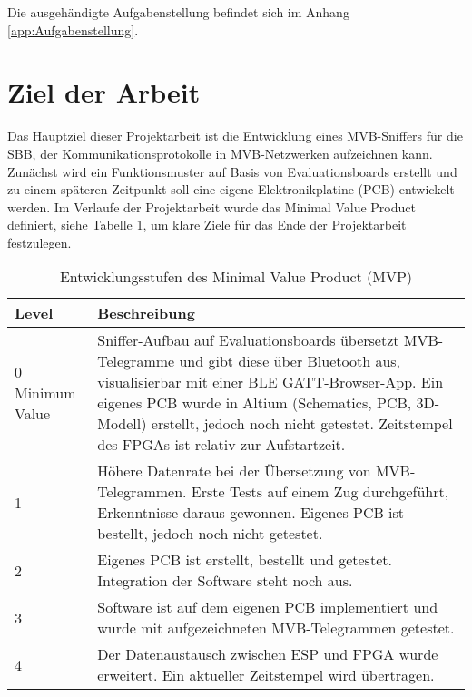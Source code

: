 Die ausgehändigte Aufgabenstellung befindet sich im Anhang \ref{app:Aufgabenstellung}.


\section{Ziel der Arbeit}
\label{Ziel der Arbeit} %

Das Hauptziel dieser Projektarbeit ist die Entwicklung eines MVB-Sniffers für die SBB, der Kommunikationsprotokolle in MVB-Netzwerken aufzeichnen kann. Zunächst wird ein Funktionsmuster auf Basis von Evaluationsboards erstellt und zu einem späteren Zeitpunkt soll eine eigene Elektronikplatine (PCB) entwickelt werden. Im Verlaufe der Projektarbeit wurde das Minimal Value Product definiert, siehe Tabelle \ref{tab:minvalueproduct}, um klare Ziele für das Ende der Projektarbeit festzulegen.
\begin{table}[H]
\centering
\begin{tabular}{|p{1cm}|p{13cm}|}
\hline
\textbf{Level} & \textbf{Beschreibung} \\ \hline
0 Minimum Value & 
Sniffer-Aufbau auf Evaluationsboards übersetzt MVB-Telegramme und gibt diese über Bluetooth aus, visualisierbar mit einer BLE GATT-Browser-App. Ein eigenes PCB wurde in Altium (Schematics, PCB, 3D-Modell) erstellt, jedoch noch nicht getestet. Zeitstempel des FPGAs ist relativ zur Aufstartzeit. \\ \hline
1 & 
Höhere Datenrate bei der Übersetzung von MVB-Telegrammen. Erste Tests auf einem Zug durchgeführt, Erkenntnisse daraus gewonnen. Eigenes PCB ist bestellt, jedoch noch nicht getestet. \\ \hline
2 & 
Eigenes PCB ist erstellt, bestellt und getestet. Integration der Software steht noch aus. \\ \hline
3 & 
Software ist auf dem eigenen PCB implementiert und wurde mit aufgezeichneten MVB-Telegrammen getestet. \\ \hline
4 & 
Der Datenaustausch zwischen ESP und FPGA wurde erweitert. Ein aktueller Zeitstempel wird übertragen. \\ \hline
\end{tabular}
\caption{Entwicklungsstufen des Minimal Value Product (MVP)}
\label{tab:minvalueproduct}
\end{table}

